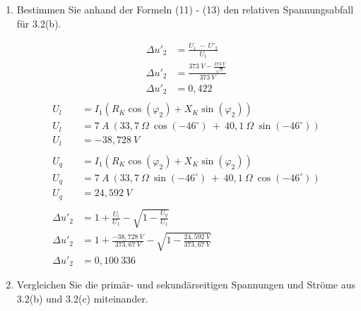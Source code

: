 \begin{enumerate}[label=\alph*)]
	\item Bestimmen Sie anhand der Formeln (11) - (13) den relativen Spannungsabfall für
	      3.2(b).

	      \begin{align*}
		      \Delta u'_2 & = \frac{U_1\ -\ U'_2}{U_1}                       \\
		      \Delta u'_2 & = \frac{373\ V -\frac{373\ V}{\sqrt{3}}}{373\ V} \\
		      \Delta u'_2 & = 0,422                                      \\
	      \end{align*}
	      \begin{align*}
		      U_l         & = I_1(R_K\cos(\varphi_2)+X_K\sin(\varphi_2))                              \\
		      U_l         & = 7\ A\ (33,7\ \Omega\ \cos(-46^\circ)\ +\ 40,1\ \Omega\ \sin(-46^\circ)) \\
		      U_l         & = -38,728\ V                                                              \\
		      \\
		      U_q         & = I_1(R_K\cos(\varphi_2)+X_K\sin(\varphi_2))                              \\
		      U_q         & = 7\ A\ (33,7\ \Omega\ \sin(-46^\circ)\ +\ 40,1\ \Omega\ \cos(-46^\circ)) \\
		      U_q         & = 24,592\ V                                                               \\
		      \\
		      \Delta u'_2 & = 1+\frac{U_l}{U_1} - \sqrt{1-\frac{U_q}{U_1}}                            \\
		      \Delta u'_2 & = 1+\frac{-38,728\ V}{373,67\ V} - \sqrt{1-\frac{24,592\ V}{373,67\ V}}   \\
		      \Delta u'_2 & = 0,100\ 336
	      \end{align*}

	\item Vergleichen Sie die primär- und sekundärseitigen Spannungen und Ströme aus
	      3.2(b) und 3.2(c) miteinander.

\end{enumerate}
